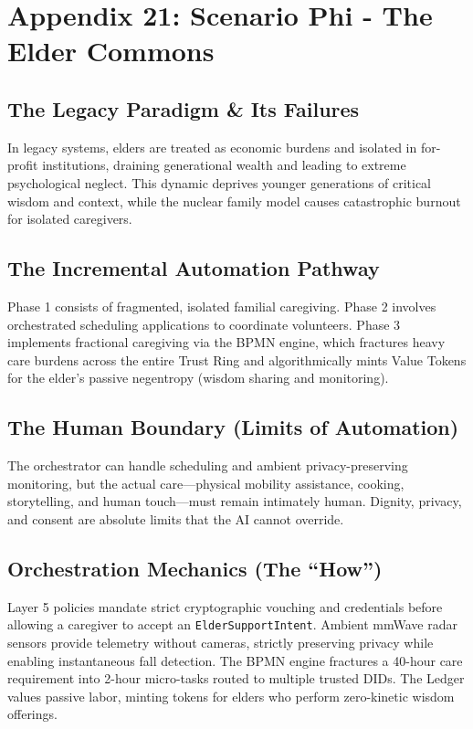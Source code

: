 \chapter{Appendix 21: Scenario Phi - The Elder Commons}

\section{The Legacy Paradigm \& Its Failures}
In legacy systems, elders are treated as economic burdens and isolated in for-profit institutions, draining generational wealth and leading to extreme psychological neglect. This dynamic deprives younger generations of critical wisdom and context, while the nuclear family model causes catastrophic burnout for isolated caregivers.

\section{The Incremental Automation Pathway}
Phase 1 consists of fragmented, isolated familial caregiving. Phase 2 involves orchestrated scheduling applications to coordinate volunteers. Phase 3 implements fractional caregiving via the BPMN engine, which fractures heavy care burdens across the entire Trust Ring and algorithmically mints Value Tokens for the elder's passive negentropy (wisdom sharing and monitoring).

\section{The Human Boundary (Limits of Automation)}
The orchestrator can handle scheduling and ambient privacy-preserving monitoring, but the actual care---physical mobility assistance, cooking, storytelling, and human touch---must remain intimately human. Dignity, privacy, and consent are absolute limits that the AI cannot override.

\section{Orchestration Mechanics (The ``How'')}
Layer 5 policies mandate strict cryptographic vouching and credentials before allowing a caregiver to accept an \texttt{ElderSupportIntent}. Ambient mmWave radar sensors provide telemetry without cameras, strictly preserving privacy while enabling instantaneous fall detection. The BPMN engine fractures a 40-hour care requirement into 2-hour micro-tasks routed to multiple trusted DIDs. The Ledger values passive labor, minting tokens for elders who perform zero-kinetic wisdom offerings.
